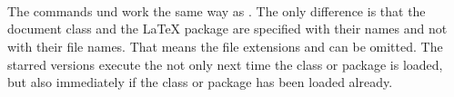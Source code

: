 \begin{Declaration}
  \\
  \\
  \\
\end{Declaration}%
%
%
%
%
The commands  und  
work the same way as .
The only difference is that the document class 
and the \LaTeX{} package  are specified
with their names and not with their file names.
That means the file extensions  and 
can be omitted.
The starred versions execute the  not
only next time the class or package is loaded, but also
immediately if the class or package has been loaded already.
%
%
%
%
%

